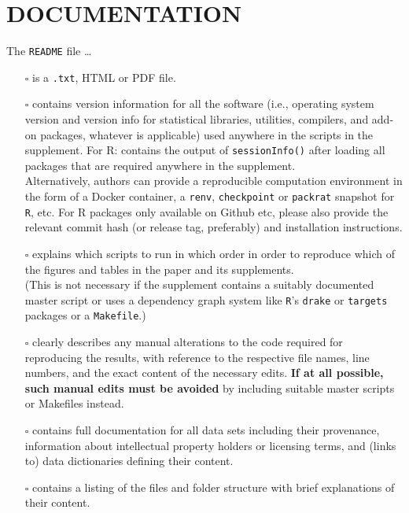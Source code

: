 \documentclass[
  paper=a4,
  ,captions=tableheading
]{scrartcl}
\let\oldtexttt\texttt
\renewcommand{\texttt}[1]{\colorbox{bgcolor}{\small \oldtexttt{#1}}}
\begin{document}
\section{DOCUMENTATION}\label{documentation}

The \texttt{README} file \ldots{}

\begin{itemize}
\item[$\square$]
  is a \texttt{.txt}, HTML or PDF file.
\item[$\square$]
  contains version information for all the software (i.e., operating system version and version info for statistical libraries, utilities, compilers, and add-on packages, whatever is applicable) used anywhere in the scripts in the supplement. For R: contains the output of \texttt{sessionInfo()} after loading all packages that are required anywhere in the supplement.\\
  Alternatively, authors can provide a reproducible computation environment in the form of a Docker container, a \texttt{renv}, \texttt{checkpoint} or \texttt{packrat} snapshot for \texttt{R}, etc.
  For R packages only available on Github etc, please also provide the relevant commit hash (or release tag, preferably) and installation instructions.
\item[$\square$]
  explains which scripts to run in which order in order to reproduce which of the figures and tables in the paper and its supplements.\\
  (This is not necessary if the supplement contains a suitably documented master script or uses a dependency graph system like \texttt{R}'s \texttt{drake} or \texttt{targets} packages or a \texttt{Makefile}.)
\item[$\square$]
  clearly describes any manual alterations to the code required for reproducing the results, with reference to the respective file names, line numbers, and the exact content of the necessary edits. \textbf{If at all possible, such manual edits must be avoided} by including suitable master scripts or Makefiles instead.
\item[$\square$]
  contains full documentation for all data sets including their provenance, information about intellectual property holders or licensing terms, and (links to) data dictionaries defining their content.
\item[$\square$]
  contains a listing of the files and folder structure with brief explanations of their content.
\end{itemize}
\end{document}
